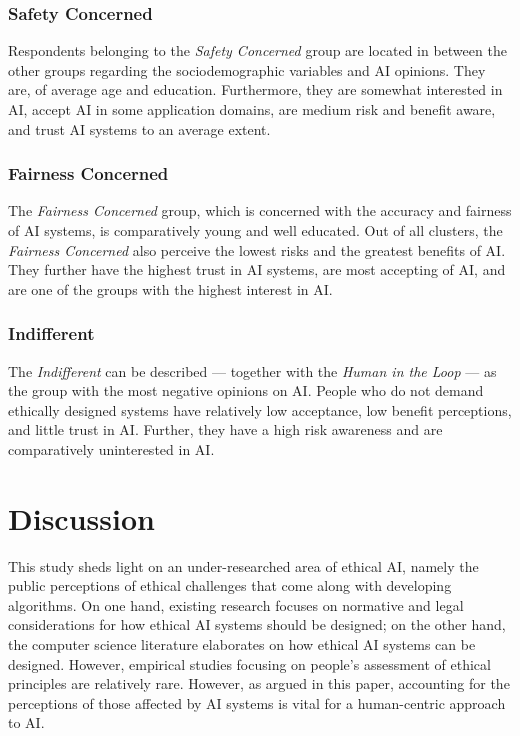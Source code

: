 \documentclass{article}
\begin{document}
\hypertarget{safety-concerned}{%
\subsubsection{Safety Concerned}\label{safety-concerned}}

Respondents belonging to the \emph{Safety Concerned} group are located
in between the other groups regarding the sociodemographic variables and
AI opinions. They are, of average age and education. Furthermore, they
are somewhat interested in AI, accept AI in some application domains,
are medium risk and benefit aware, and trust AI systems to an average
extent.

\hypertarget{fairness-concerned}{%
\subsubsection{Fairness Concerned}\label{fairness-concerned}}

The \emph{Fairness Concerned} group, which is concerned with the
accuracy and fairness of AI systems, is comparatively young and well
educated. Out of all clusters, the \emph{Fairness Concerned} also
perceive the lowest risks and the greatest benefits of AI. They further
have the highest trust in AI systems, are most accepting of AI, and are
one of the groups with the highest interest in AI.

\hypertarget{indifferent}{%
\subsubsection{Indifferent}\label{indifferent}}

The \emph{Indifferent} can be described --- together with the
\emph{Human in the Loop} --- as the group with the most negative
opinions on AI. People who do not demand ethically designed systems have
relatively low acceptance, low benefit perceptions, and little trust in
AI. Further, they have a high risk awareness and are comparatively
uninterested in AI.

\hypertarget{discussion}{%
\section{Discussion}\label{discussion}}

This study sheds light on an under-researched area of ethical AI, namely
the public perceptions of ethical challenges that come along with
developing algorithms. On one hand, existing research focuses on
normative and legal considerations for how ethical AI systems should be
designed; on the other hand, the computer science literature elaborates
on how ethical AI systems can be designed. However, empirical studies
focusing on people's assessment of ethical principles are relatively
rare. However, as argued in this paper, accounting for the perceptions
of those affected by AI systems is vital for a human-centric approach to
AI.
\end{document}
